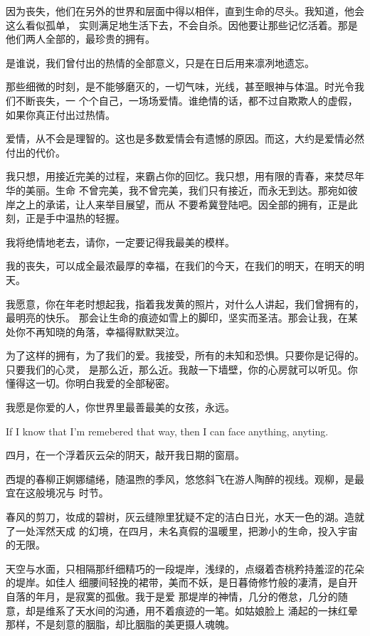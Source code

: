		因为丧失，他们在另外的世界和层面中得以相伴，直到生命的尽头。我知道，他会这么看似孤单，
	实则满足地生活下去，不会自杀。因他要让那些记忆活着。那是他们两人全部的，最珍贵的拥有。

		是谁说，我们曾付出的热情的全部意义，只是在日后用来凛冽地遗忘。

		那些细微的时刻，是不能够磨灭的，一切气味，光线，甚至眼神与体温。时光令我们不断丧失，一
	个个自己，一场场爱情。谁绝情的话，都不过自欺欺人的虚假，如果你真正付出过热情。

		爱情，从不会是理智的。这也是多数爱情会有遗憾的原因。而这，大约是爱情必然付出的代价。

		我只想，用接近完美的过程，来霸占你的回忆。我只想，用有限的青春，来焚尽年华的美丽。生命
	不曾完美，我不曾完美，我们只有接近，而永无到达。那宛如彼岸之上的承诺，让人来举目展望，而从
	不要希冀登陆吧。因全部的拥有，正是此刻，正是手中温热的轻握。

		我将绝情地老去，请你，一定要记得我最美的模样。

		我的丧失，可以成全最浓最厚的幸福，在我们的今天，在我们的明天，在明天的明天。

		我愿意，你在年老时想起我，指着我发黄的照片，对什么人讲起，我们曾拥有的，最明亮的快乐。
	那会让生命的痕迹如雪上的脚印，坚实而圣洁。那会让我，在某处你不再知晓的角落，幸福得默默哭泣。

		为了这样的拥有，为了我们的爱。我接受，所有的未知和恐惧。只要你是记得的。只要我们的心灵，
	是那么近，那么近。我敲一下墙壁，你的心房就可以听见。你懂得这一切。你明白我爱的全部秘密。

		我愿是你爱的人，你世界里最善最美的女孩，永远。

		If I know that I'm remebered that way, then I can face anything, anyting.

	\endwriting



		四月，在一个浮着灰云朵的阴天，敲开我日期的窗扇。

		西堤的春柳正婀娜缱绻，随温煦的季风，悠悠斜飞在游人陶醉的视线。观柳，是最宜在这般境况与
	时节。

		春风的剪刀，妆成的碧树，灰云缝隙里犹疑不定的洁白日光，水天一色的湖。造就了一处浑然天成
	的幻境，在四月，未名真假的温暖里，把渺小的生命，投入宇宙的无限。

		天空与水面，只相隔那纤细精巧的一段堤岸，浅绿的，点缀着杏桃矜持羞涩的花朵的堤岸。如佳人
	细腰间轻挽的裙带，美而不妖，是日暮倚修竹般的凄清，是自开自落的年月，是寂寞的孤傲。我于是爱
	那堤岸的神情，几分的倦怠，几分的随意，却是维系了天水间的沟通，用不着痕迹的一笔。如姑娘脸上
	涌起的一抹红晕那样，不是刻意的胭脂，却比胭脂的美更摄人魂魄。

